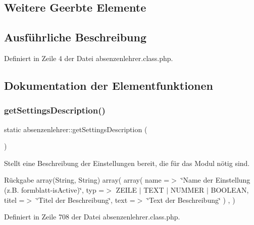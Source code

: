 \subsection*{Weitere Geerbte Elemente}


\subsection{Ausführliche Beschreibung}


Definiert in Zeile 4 der Datei absenzenlehrer.\+class.\+php.



\subsection{Dokumentation der Elementfunktionen}
\mbox{\label{classabsenzenlehrer_a1dbf2ba5acfa095b712acd3c88fe84fe}} 
\subsubsection{\texorpdfstring{get\+Settings\+Description()}{getSettingsDescription()}}
{\footnotesize\ttfamily static absenzenlehrer\+::get\+Settings\+Description (\begin{DoxyParamCaption}{ }\end{DoxyParamCaption})\hspace{0.3cm}{\ttfamily [static]}}

Stellt eine Beschreibung der Einstellungen bereit, die für das Modul nötig sind. \begin{DoxyReturn}{Rückgabe}
array(\+String, String) array( array( \textquotesingle{}name\textquotesingle{} =$>$ \char`\"{}\+Name der Einstellung (z.\+B. formblatt-\/is\+Active)\char`\"{}, \textquotesingle{}typ\textquotesingle{} =$>$ Z\+E\+I\+LE $\vert$ T\+E\+XT $\vert$ N\+U\+M\+M\+ER $\vert$ B\+O\+O\+L\+E\+AN, \textquotesingle{}titel\textquotesingle{} =$>$ \char`\"{}\+Titel der Beschreibung\char`\"{}, \textquotesingle{}text\textquotesingle{} =$>$ \char`\"{}\+Text der Beschreibung\char`\"{} ) , ) 
\end{DoxyReturn}


Definiert in Zeile 708 der Datei absenzenlehrer.\+class.\+php.

\mbox{\label{classabsenzenlehrer_a75636b34c0b7caf02ab00a279993fd66}} 
